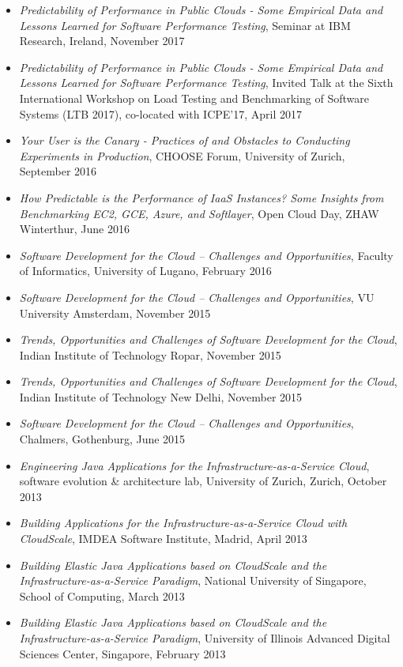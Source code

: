 \documentclass[paper=letter,fontsize=11pt]{scrartcl} %
\begin{document}
\begin{itemize}
\item \emph{Predictability of Performance in Public Clouds - Some Empirical Data and Lessons Learned for Software Performance Testing}, Seminar at IBM Research, Ireland, November 2017
\item \emph{Predictability of Performance in Public Clouds - Some Empirical Data and Lessons Learned for Software Performance Testing}, Invited Talk at the Sixth International Workshop on Load Testing and Benchmarking of Software Systems (LTB 2017), co-located with ICPE'17, April 2017
\item \emph{Your User is the Canary - Practices of and Obstacles to Conducting Experiments in Production}, CHOOSE Forum, University of Zurich, September 2016
\item \emph{How Predictable is the Performance of IaaS Instances? Some Insights from Benchmarking EC2, GCE, Azure, and Softlayer}, Open Cloud Day, ZHAW Winterthur, June 2016
\item \emph{Software Development for the Cloud – Challenges and Opportunities}, Faculty of Informatics, University of Lugano, February 2016
\item \emph{Software Development for the Cloud – Challenges and Opportunities}, VU University Amsterdam, November 2015
\item \emph{Trends, Opportunities and Challenges of Software Development for the Cloud}, Indian Institute of Technology Ropar, November 2015
\item \emph{Trends, Opportunities and Challenges of Software Development for the Cloud}, Indian Institute of Technology New Delhi, November 2015
\item \emph{Software Development for the Cloud -- Challenges and Opportunities}, Chalmers, Gothenburg, June 2015
\item \emph{Engineering Java Applications for the Infrastructure-as-a-Service Cloud}, software evolution \& architecture lab, University of Zurich, Zurich, October 2013
\item \emph{Building Applications for the Infrastructure-as-a-Service Cloud with CloudScale}, IMDEA Software Institute, Madrid, April 2013
\item \emph{Building Elastic Java Applications based on CloudScale and the Infrastructure-as-a-Service Paradigm}, National University of Singapore, School of Computing, March 2013
\item \emph{Building Elastic Java Applications based on CloudScale and the Infrastructure-as-a-Service Paradigm}, University of Illinois Advanced Digital Sciences Center, Singapore, February 2013
\end{itemize}
\end{document}
